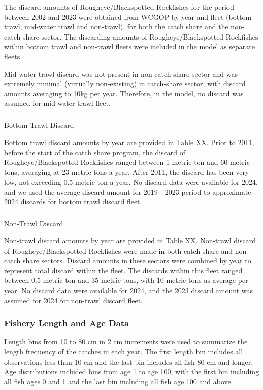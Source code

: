 \documentclass[
]{scrartcl}
\makeatletter
\let\oldsubparagraph\subparagraph
\renewcommand{\subparagraph}{
    \@ifstar
      \xxxSubParagraphStar
      \xxxSubParagraphNoStar
  }
\newcommand{\xxxSubParagraphStar}[1]{\oldsubparagraph*{#1}\mbox{}}
\newcommand{\xxxSubParagraphNoStar}[1]{\oldsubparagraph{#1}\mbox{}}
\makeatother
\begin{document}
The discard amounts of Rougheye/Blackspotted Rockfishes for the period
between 2002 and 2023 were obtained from WCGOP by year and fleet (bottom
trawl, mid-water trawl and non-trawl), for both the catch share and the
non-catch share sector. The discarding amounts of Rougheye/Blackspotted
Rockfishes within bottom trawl and non-trawl fleets were included in the
model as separate fleets.

Mid-water trawl discard was not present in non-catch share sector and
was extremely minimal (virtually non-existing) in catch-share sector,
with discard amounts averaging to 10kg per year. Therefore, in the
model, no discard was assumed for mid-water trawl fleet.

\subparagraph{Bottom Trawl Discard}\label{bottom-trawl-discard}

Bottom trawl discard amounts by year are provided in Table XX. Prior to
2011, before the start of the catch share program, the discard of
Rougheye/Blackspotted Rockfishes ranged between 1 metric ton and 60
metric tons, averaging at 23 metric tons a year. After 2011, the discard
has been very low, not exceeding 0.5 metric ton a year. No discard data
were available for 2024, and we used the average discard amount for 2019
- 2023 period to approximate 2024 discards for bottom trawl discard
fleet.

\subparagraph{Non-Trawl Discard}\label{non-trawl-discard}

Non-trawl discard amounts by year are provided in Table XX. Non-trawl
discard of Rougheye/Blackspotted Rockfishes were made in both catch
share and non-catch share sectors. Discard amounts in these sectors were
combined by year to represent total discard within the fleet. The
discards within this fleet ranged between 0.5 metric ton and 35 metric
tons, with 10 metric tons as average per year. No discard data were
available for 2024, and the 2023 discard amount was assumed for 2024 for
non-trawl discard fleet.

\subsubsection{Fishery Length and Age
Data}\label{fishery-length-and-age-data}

Length bins from 10 to 80 cm in 2 cm increments were used to summarize
the length frequency of the catches in each year. The first length bin
includes all observations less than 10 cm and the last bin includes all
fish 80 cm and longer. Age distributions included bins from age 1 to age
100, with the first bin including all fish ages 0 and 1 and the last bin
including all fish age 100 and above.
\end{document}
